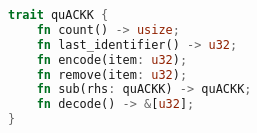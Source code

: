 \begin{lstfloat}[t]
\begin{lstlisting}[language=Rust]
trait quACKK {
    fn count() -> usize;
    fn last_identifier() -> u32;
    fn encode(item: u32);
    fn remove(item: u32);
    fn sub(rhs: quACKK) -> quACKK;
    fn decode() -> &[u32];
}
\end{lstlisting}
\label{lst:quack-interface}
\end{lstfloat}
